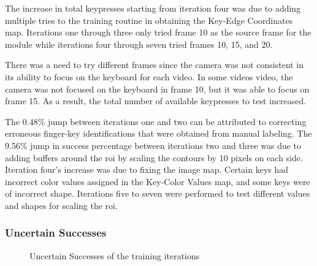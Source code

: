 \documentclass[preprint,12pt,authoryear]{elsarticle}
\begin{document}
The increase in total keypresses starting from iteration four was due to adding
multiple tries to the training routine in obtaining the Key-Edge Coordinates
map. Iterations one through three only tried frame 10 as the source frame for
the module while iterations four through seven tried frames 10, 15, and 20.

There was a need to try different frames since the camera was not consistent in
its ability to focus on the keyboard for each video. In some videos video, the
camera was not focused on the keyboard in frame 10, but it was able to focus on
frame 15. As a result, the total number of available keypresses to test
increased.

The 0.48\% jump between iterations one and two can be attributed to correcting
erroneous finger-key identifications that were obtained from manual labeling.
The 9.56\% jump in success percentage between iterations two and three was due
to adding buffers around the \ac{roi} by scaling the contours by 10 pixels on
each side. Iteration four's increase was due to fixing the image map. Certain
keys had incorrect color values assigned in the Key-Color Values map, and some
keys were of incorrect shape. Iterations five to seven were performed to test
different values and shapes for scaling the \ac{roi}.

\subsubsection{Uncertain Successes}

\begin{figure}[H]
	\centering
	\caption{Uncertain Successes of the training iterations}
	\label{fig:rd-training-uncertain-successes}
\end{figure}
\end{document}
